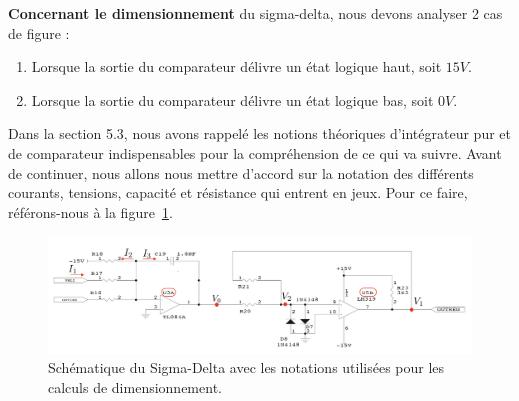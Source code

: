 \documentclass[10pt, oneside, a4paper]{article}
\begin{document}
\noindent\textbf{Concernant le dimensionnement} du sigma-delta, nous devons analyser 2 cas de figure : 
\begin{enumerate}
\item Lorsque la sortie du comparateur délivre un état logique haut, soit $15V$.
\item Lorsque la sortie du comparateur délivre un état logique bas, soit $0V$.
\end{enumerate}


Dans la section 5.3, nous avons rappelé les notions théoriques d'intégrateur pur et de comparateur indispensables pour la compréhension de ce qui va suivre. Avant de continuer, nous allons nous mettre d'accord sur la notation des différents courants, tensions, capacité et résistance qui entrent en jeux. Pour ce faire, référons-nous à la figure~\ref{fig:notation}. \\
\begin{figure}[!ht]
	\centering
	\includegraphics[width=\textwidth]{image/Sigma_Delta_Notation.png}
	\caption{Schématique du Sigma-Delta avec les notations utilisées pour les calculs de dimensionnement.}
	\label{fig:notation}
\end{figure}
\end{document}
